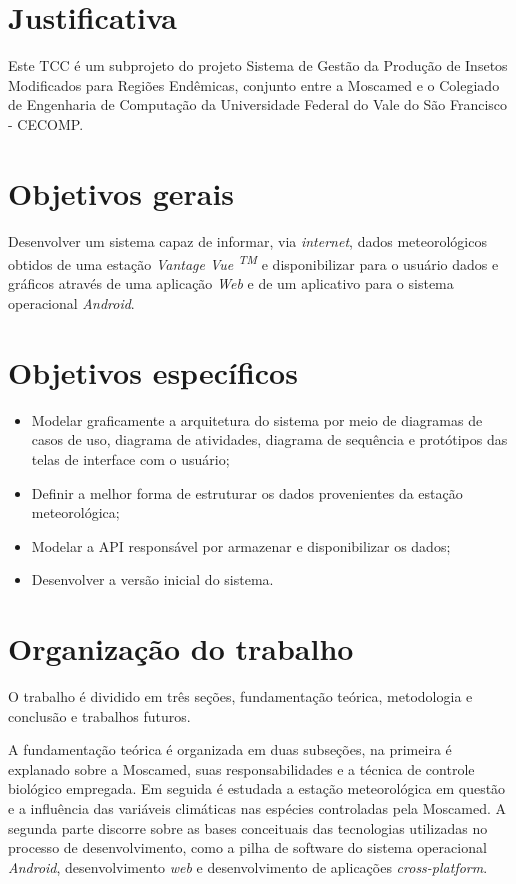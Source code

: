 \section{Justificativa}

Este TCC é um subprojeto do projeto Sistema de Gestão da Produção de Insetos Modificados para Regiões Endêmicas, conjunto entre a Moscamed e o Colegiado de Engenharia de Computação da Universidade Federal do Vale do São Francisco - CECOMP.


\section{Objetivos gerais}

Desenvolver um sistema capaz de informar, via \textit{internet}, dados meteorológicos obtidos de uma estação \textit{Vantage Vue \textsuperscript{TM}} e disponibilizar para o usuário dados e gráficos através de uma aplicação \textit{Web} e de um aplicativo para o sistema operacional \textit{Android}.

\section{Objetivos específicos}

\begin{itemize}
    \item Modelar graficamente a arquitetura do sistema por meio de diagramas de casos de uso, diagrama de atividades, diagrama de sequência e protótipos das telas de interface com o usuário;
    \item Definir a melhor forma de estruturar os dados provenientes da estação meteorológica;
    \item Modelar a API responsável por armazenar e disponibilizar os dados;
	\item Desenvolver a versão inicial do sistema.
\end{itemize}

\section{Organização do trabalho}

O trabalho é dividido em três seções, fundamentação teórica, metodologia e conclusão e trabalhos futuros.

A fundamentação teórica é organizada em duas subseções, na primeira é explanado sobre a Moscamed, suas responsabilidades e a técnica de controle biológico empregada. Em seguida é estudada a estação meteorológica em questão e a influência das variáveis climáticas nas espécies controladas pela Moscamed. A segunda parte discorre sobre as bases conceituais das tecnologias utilizadas no processo de desenvolvimento, como a pilha de software do sistema operacional \textit{Android}, desenvolvimento \textit{web} e desenvolvimento de aplicações \textit{cross-platform}.

